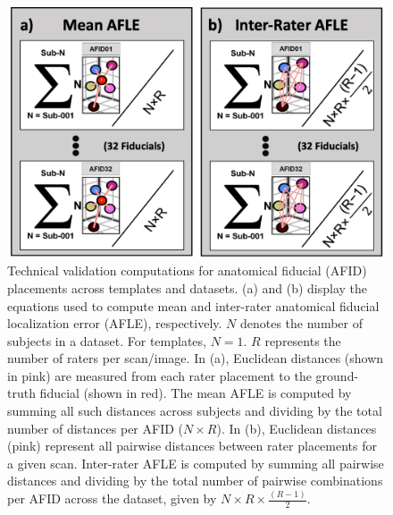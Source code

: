 \begin{figure}[hbt!]
    \centering
    \includegraphics[width=1\linewidth]{figs/ch2_Figure_AFLE.png}
    \caption{
    Technical validation computations for anatomical fiducial (AFID) placements across templates and datasets. (a) and (b) display the equations used to compute mean and inter-rater anatomical fiducial localization error (AFLE), respectively. $N$ denotes the number of subjects in a dataset. For templates, $N = 1$. $R$ represents the number of raters per scan/image. In (a), Euclidean distances (shown in pink) are measured from each rater placement to the ground-truth fiducial (shown in red). The mean AFLE is computed by summing all such distances across subjects and dividing by the total number of distances per AFID ($N \times R$). In (b), Euclidean distances (pink) represent all pairwise distances between rater placements for a given scan. Inter-rater AFLE is computed by summing all pairwise distances and dividing by the total number of pairwise combinations per AFID across the dataset, given by $N \times R \times \frac{(R - 1)}{2}$.
    }    
\label{fig:ch2_Figure_AFLE}
\end{figure}

